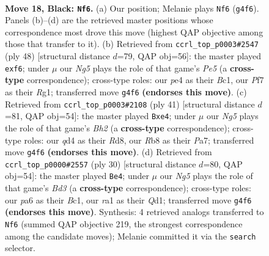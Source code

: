\documentclass[11pt]{article}
\begin{document}
\clearpage

\begin{figure}[p]\centering
\begin{subfigure}{0.46\textwidth}\centering
\resizebox{\linewidth}{!}{%
\newchessgame
\chessboard[
  setfen={1rbqrk2/p1p2p1p/P1pp4/8/2PQP1n1/5N2/2P2PP1/R1B2RK1 b - - 0 18},
  showmover=false,
  pgfstyle=straightmove, color=movearrow, markmove={g4-f6}
]}
\caption{}
\end{subfigure}\hfill
\begin{subfigure}{0.46\textwidth}\centering
\resizebox{\linewidth}{!}{%
\newchessgame
\chessboard[
  setfen={4kr1r/p3n3/q3pp1p/Pp1pP2P/3n4/Q5N1/2P2PK1/R1B3R1 w - - 0 25},
  showmover=false,
  pgfstyle=straightmove, color=movearrow, markmove={e5-f6}
]}
\caption{}
\end{subfigure}
\\[4pt]
\begin{subfigure}{0.46\textwidth}\centering
\resizebox{\linewidth}{!}{%
\newchessgame
\chessboard[
  setfen={2kr3r/pp2qp1b/1np4B/4p2P/P2PP3/2Q2P2/1P6/2KR1B1R b - - 0 21},
  showmover=false,
  pgfstyle=straightmove, color=movearrow, markmove={h7-e4}
]}
\caption{}
\end{subfigure}\hfill
\begin{subfigure}{0.46\textwidth}\centering
\resizebox{\linewidth}{!}{%
\newchessgame
\chessboard[
  setfen={1r2r1k1/1pp1bppp/p1n5/3q4/3P1P2/2PB4/P4P1P/1RBQR1K1 w - - 1 16},
  showmover=false,
  pgfstyle=straightmove, color=movearrow, markmove={d3-e4}
]}
\caption{}
\end{subfigure}
\caption{\textbf{Move 18, Black: \texttt{Nf6}.} (a) Our position; Melanie plays \texttt{Nf6} (\texttt{g4f6}). Panels (b)--(d) are the retrieved master positions whose correspondence most drove this move (highest QAP objective among those that transfer to it). (b) Retrieved from \texttt{ccrl\_top\_p0003\#2547} (ply 48) [structural distance $d$=79, QAP obj=56]: the master played \texttt{exf6}; under $\mu$ our \emph{Ng5} plays the role of that game's \emph{Pe5} (a \textbf{cross-type} correspondence); cross-type roles: our \emph{p}e4 as their \emph{B}c1, our \emph{P}f7 as their \emph{R}g1; transferred move \texttt{g4f6} \textbf{(endorses this move)}. (c) Retrieved from \texttt{ccrl\_top\_p0003\#2108} (ply 41) [structural distance $d$=81, QAP obj=54]: the master played \texttt{Bxe4}; under $\mu$ our \emph{Ng5} plays the role of that game's \emph{Bh2} (a \textbf{cross-type} correspondence); cross-type roles: our \emph{q}d4 as their \emph{R}d8, our \emph{R}b8 as their \emph{P}a7; transferred move \texttt{g4f6} \textbf{(endorses this move)}. (d) Retrieved from \texttt{ccrl\_top\_p0000\#2557} (ply 30) [structural distance $d$=80, QAP obj=54]: the master played \texttt{Be4}; under $\mu$ our \emph{Ng5} plays the role of that game's \emph{Bd3} (a \textbf{cross-type} correspondence); cross-type roles: our \emph{p}a6 as their \emph{B}c1, our \emph{r}a1 as their \emph{Q}d1; transferred move \texttt{g4f6} \textbf{(endorses this move)}. Synthesis: 4 retrieved analogs transferred to \texttt{Nf6} (summed QAP objective 219, the strongest correspondence among the candidate moves); Melanie committed it via the \texttt{search} selector.}
\label{fig:thought-m35}
\end{figure}
\end{document}
